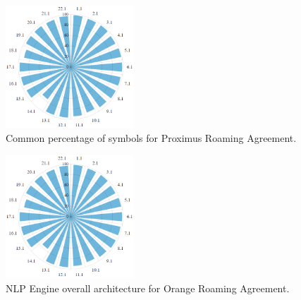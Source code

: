 \documentclass[conference]{style/IEEEtran}
\begin{document}
\begin{figure}[htbp]
\centerline{\includegraphics[width=0.43\textwidth]{images/Proximus.png}}
\caption{Common percentage of symbols for Proximus Roaming Agreement.}
\label{fig3}
\end{figure}

\begin{figure}[htbp]
\centerline{\includegraphics[width=0.43\textwidth]{images/Orange.png}}
\caption{NLP Engine overall architecture for Orange Roaming Agreement.}
\label{fig4}
\end{figure}
\end{document}
